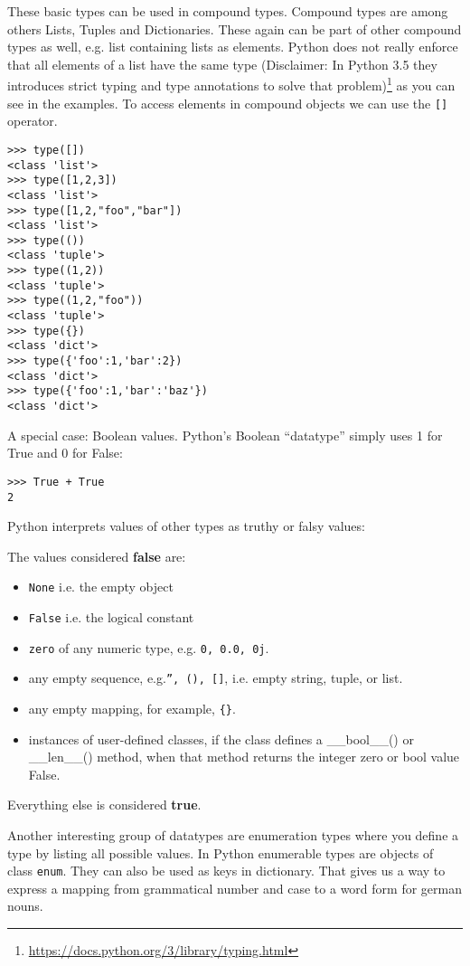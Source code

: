 \documentclass{scrartcl}
\begin{document}
These basic types can be used in compound types. Compound types are among others Lists, Tuples and Dictionaries.
These again can be part of other compound types as well, e.g. list containing lists as elements. Python does not really enforce
that all elements of a list have the same type (Disclaimer: In Python 3.5 they introduces strict typing and type annotations to solve that problem)\footnote{\url{https://docs.python.org/3/library/typing.html}} as you can see in the examples. To access elements in compound objects we
can use the \texttt{[]} operator.

\begin{verbatim}
>>> type([])
<class 'list'>
>>> type([1,2,3])
<class 'list'>
>>> type([1,2,"foo","bar"])
<class 'list'>
>>> type(())
<class 'tuple'>
>>> type((1,2))
<class 'tuple'>
>>> type((1,2,"foo"))
<class 'tuple'>
>>> type({})
<class 'dict'>
>>> type({'foo':1,'bar':2})
<class 'dict'>
>>> type({'foo':1,'bar':'baz'})
<class 'dict'>
\end{verbatim}

A special case: Boolean values. Python's Boolean ``datatype'' simply uses 1 for True and 0 for False:

\begin{verbatim}
>>> True + True
2
\end{verbatim}

Python interprets values of other types as truthy or falsy values:

The values considered \textbf{false} are: 
\begin{itemize}
\item \texttt{None} i.e. the empty object
\item \texttt{False} i.e. the logical constant
\item \texttt{zero} of any numeric type, e.g. \texttt{0, 0.0, 0j}.
\item any empty sequence, e.g.\texttt{'', (), []}, i.e. empty string, tuple, or list.
\item any empty mapping, for example, \texttt{\{\}}.
\item instances of user-defined classes, if the class defines a \_\_bool\_\_() or \_\_len\_\_() method, when that method returns the integer zero or bool value False.
\end{itemize}

Everything else is considered \textbf{true}.

Another interesting group of datatypes are enumeration types where you define a type by listing all possible values. In Python enumerable types are objects of class \texttt{enum}. They can also be used as keys in dictionary. That gives us a way to express a mapping from grammatical number and case to a word form for german nouns.
\end{document}
